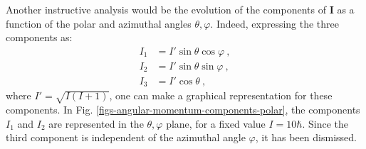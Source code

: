 Another instructive analysis would be the evolution of the components of $\mathbf{I}$ as a function of the polar and azimuthal angles $\theta,\varphi$. Indeed, expressing the three components as:
\begin{align}
    I_1&=I'\sin\theta\cos\varphi\ ,\\
    I_2&=I'\sin\theta\sin\varphi\ ,\\
    I_3&=I'\cos\theta\ ,
    \label{angular-momentum-polar-components}
\end{align}
where $I'=\sqrt{I(I+1)}$, one can make a graphical representation for these components. In Fig. \ref{figs-angular-momentum-components-polar}, the components $I_1$ and $I_2$ are represented in the $\theta,\varphi$ plane, for a fixed value $I=10\hbar$. Since the third component is independent of the azimuthal angle $\varphi$, it has been dismissed.

